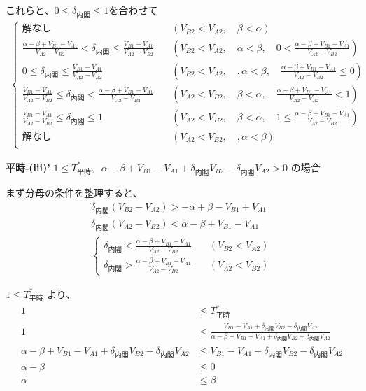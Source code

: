 \documentclass[main.tex]{subfiles}
\begin{document}
これらと、$0 \le \delta_{内閣} \le 1$を合わせて
\begin{align*}
\begin{cases}
    解なし \quad &(V_{B2} < V_{A2},\quad \beta < \alpha) \\[1em]
    \frac{\alpha-\beta + V_{B1}-V_{A1}}{V_{A2} - V_{B2}} < \delta_{内閣} \le   \frac{ V_{B1} - V_{A1} }{ V_{A2} - V_{B2} } \quad &(V_{B2} < V_{A2},\quad \alpha < \beta, \quad  0 < \frac{\alpha-\beta + V_{B1}-V_{A1}}{V_{A2} - V_{B2}}) \\[1em]
    0 \le \delta_{内閣} \le  \frac{ V_{B1} - V_{A1} }{ V_{A2} - V_{B2} } \quad &(V_{B2} < V_{A2},\quad, \alpha < \beta,\quad \frac{\alpha-\beta + V_{B1}-V_{A1}}{V_{A2} - V_{B2}} \le 0)\\[1em]
    \frac{ V_{B1} - V_{A1} }{ V_{A2} - V_{B2} } \le \delta_{内閣} <  \frac{\alpha-\beta + V_{B1}-V_{A1}}{V_{A2} - V_{B2}} \quad &(V_{A2} < V_{B2},\quad \beta < \alpha, \quad \frac{\alpha-\beta + V_{B1}-V_{A1}}{V_{A2} - V_{B2}} < 1) \\[1em]
    \frac{ V_{B1} - V_{A1} }{ V_{A2} - V_{B2} } \le \delta_{内閣} \le 1 \quad &(V_{A2} < V_{B2},\quad \beta < \alpha, \quad 1 \le \frac{\alpha-\beta + V_{B1}-V_{A1}}{V_{A2} - V_{B2}}) \\[1em]
    解なし \quad &(V_{A2} < V_{B2},\quad, \alpha < \beta)\\[1em]
\end{cases}
\end{align*}



\newpage
\textbf{平時-(iii)'}\; $1 \le T^*_{平時} ,\;\; \alpha-\beta + V_{B1}-V_{A1} + \delta_{内閣}V_{B2} - \delta_{内閣}V_{A2} > 0$ の場合


まず分母の条件を整理すると、
\begin{align*}
    \delta_{内閣}(V_{B2} - V_{A2}) > -\alpha+\beta - V_{B1}+V_{A1} \\
    \delta_{内閣}(V_{A2} - V_{B2}) < \alpha-\beta + V_{B1}-V_{A1}\\
    \begin{cases}
        \delta_{内閣} < \frac{\alpha-\beta + V_{B1}-V_{A1}}{V_{A2} - V_{B2}} \quad &(V_{B2} < V_{A2})\\[1em]
        \delta_{内閣} > \frac{\alpha-\beta + V_{B1}-V_{A1}}{V_{A2} - V_{B2}} \quad &(V_{A2} < V_{B2})
    \end{cases}
\end{align*}


$1 \le T^*_{平時}$ より、
\begin{align*}
    1 &\le T^*_{平時}  \\
    1 &\le \frac{ V_{B1} - V_{A1} +\delta_{内閣}V_{B2} - \delta_{内閣}V_{A2} }{ \alpha-\beta + V_{B1}-V_{A1} + \delta_{内閣}V_{B2} - \delta_{内閣}V_{A2} }\\[1em]
    \alpha-\beta + V_{B1}-V_{A1} + \delta_{内閣}V_{B2} - \delta_{内閣}V_{A2}  &\le V_{B1} - V_{A1} +\delta_{内閣}V_{B2} - \delta_{内閣}V_{A2} \\[1em]
    \alpha - \beta &\le 0\\
    \alpha &\le \beta
\end{align*}
\end{document}

